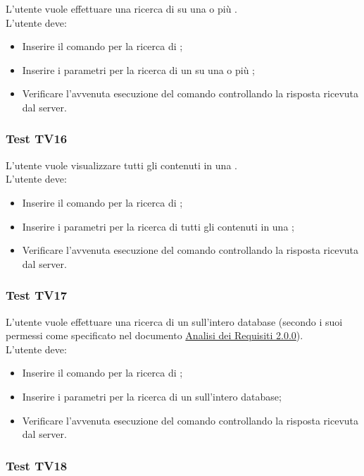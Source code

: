 \documentclass{scalatekids-article}
\begin{document}
L'utente vuole effettuare una ricerca di  su una o più .\\
L'utente deve:
\begin{itemize}
\item Inserire il comando per la ricerca di ;
\item Inserire i parametri per la ricerca di un  su una o più ;
\item Verificare l'avvenuta esecuzione del comando controllando la risposta ricevuta dal server.
\end{itemize}

\subsubsection{Test TV16}

L'utente vuole visualizzare tutti gli  contenuti in una .\\
L'utente deve:
\begin{itemize}
\item Inserire il comando per la ricerca di ;
\item Inserire i parametri per la ricerca di tutti gli  contenuti in una ;
\item Verificare l'avvenuta esecuzione del comando controllando la risposta ricevuta dal server.
\end{itemize}

\subsubsection{Test TV17}

L'utente vuole effettuare una ricerca di un  sull'intero database (secondo i suoi permessi come specificato nel documento \href{run:../Esterni/AnalisiDeiRequisiti\_v2.0.0.pdf}{Analisi dei Requisiti 2.0.0}).\\
L'utente deve:
\begin{itemize}
\item Inserire il comando per la ricerca di ;
\item Inserire i parametri per la ricerca di un  sull'intero database;
\item Verificare l'avvenuta esecuzione del comando controllando la risposta ricevuta dal server.
\end{itemize}

\subsubsection{Test TV18}
\end{document}
